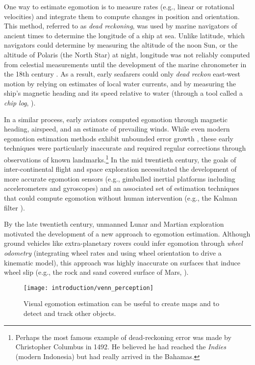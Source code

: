  One way to estimate egomotion is to measure rates (e.g., linear or rotational velocities) and integrate them to compute changes in position and orientation. This method, referred to as \textit{dead reckoning}, was used by marine navigators of ancient times to determine the longitude of a ship at sea. Unlike latitude, which navigators could determine by measuring the altitude of the noon Sun, or the altitude of Polaris (the North Star) at night, longitude was not reliably computed from celestial measurements until the development of the marine chronometer in the 18th century \citep{Barfoot2017-ri}. As a result, early seafarers could only \textit{dead reckon} east-west motion by relying on estimates of local water currents, and by measuring the ship's magnetic heading and its speed relative to water (through a tool called a \textit{chip log}, ). 

In a similar process, early aviators computed egomotion through magnetic heading, airspeed, and an estimate of prevailing winds. While even modern egomotion estimation methods exhibit unbounded error growth \citep{Olson2003-ax}, these early techniques were particularly inaccurate and required regular corrections through observations of known landmarks.\footnote{Perhaps the most famous example of dead-reckoning error was made by Christopher Columbus in 1492. He believed he had reached the \textit{Indies} (modern Indonesia) but had really arrived in the Bahamas.} In the mid twentieth century, the goals of inter-continental flight and space exploration necessitated the development of more accurate egomotion sensors (e.g., gimballed inertial platforms including accelerometers and gyroscopes) and an associated set of estimation techniques that could compute egomotion without human intervention (e.g., the Kalman filter \citep{Grewal2010-ts}).


By the late twentieth century, unmanned Lunar and Martian exploration motivated the development of a new approach to egomotion estimation. Although ground vehicles like extra-planetary rovers could infer egomotion through \textit{wheel odometry} (integrating wheel rates and using wheel orientation to drive a kinematic model), this approach was highly inaccurate on surfaces that induce wheel slip (e.g., the rock and sand covered surface of Mars, ). 

\begin{wrapfigure}{r}{0.45\textwidth}
	\centering
	\texttt{[image: introduction/venn\_perception]}
	\caption{Visual egomotion estimation can be useful to create maps and to detect and track other objects.}
	\vspace{1.2em}
	\label{fig:intro_state_venn}
\end{wrapfigure}

